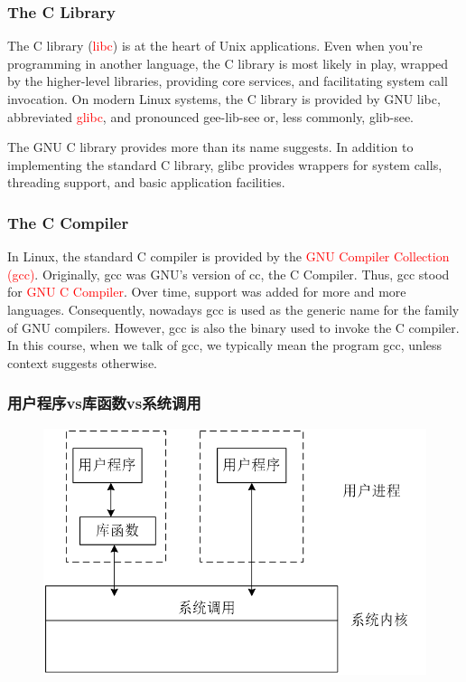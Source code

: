 \documentclass{beamer}
\begin{document}
\begin{frame}
\frametitle{The C Library}
The C library (\textcolor{red}{libc}) is at the heart of Unix applications. Even when you're programming in another language, the C library is most likely in play, wrapped by the higher-level libraries, providing core services, and facilitating system call invocation. On modern Linux systems, the C library is provided by GNU libc, abbreviated \textcolor{red}{glibc}, and pronounced gee-lib-see or, less commonly, glib-see.

The GNU C library provides more than its name suggests. In addition to implementing the standard C library, glibc provides wrappers for system calls, threading support, and basic application facilities.
\end{frame}

\begin{frame}
\frametitle{The C Compiler}
In Linux, the standard C compiler is provided by the \textcolor{red}{GNU Compiler Collection (gcc)}. Originally, gcc was GNU's version of cc, the C Compiler. Thus, gcc stood for \textcolor{red}{GNU C Compiler}. Over time, support was added for more and more languages. Consequently, nowadays gcc is used as the generic name for the family of GNU compilers. However, gcc is also the binary used to invoke the C compiler. In this course, when we talk of gcc, we typically mean the program gcc, unless context suggests otherwise.

\end{frame}


\begin{frame}
\frametitle{用户程序vs库函数vs系统调用}

\begin{figure}
\includegraphics[width=1\linewidth]{601}
\end{figure}
\end{frame}
\end{document}
